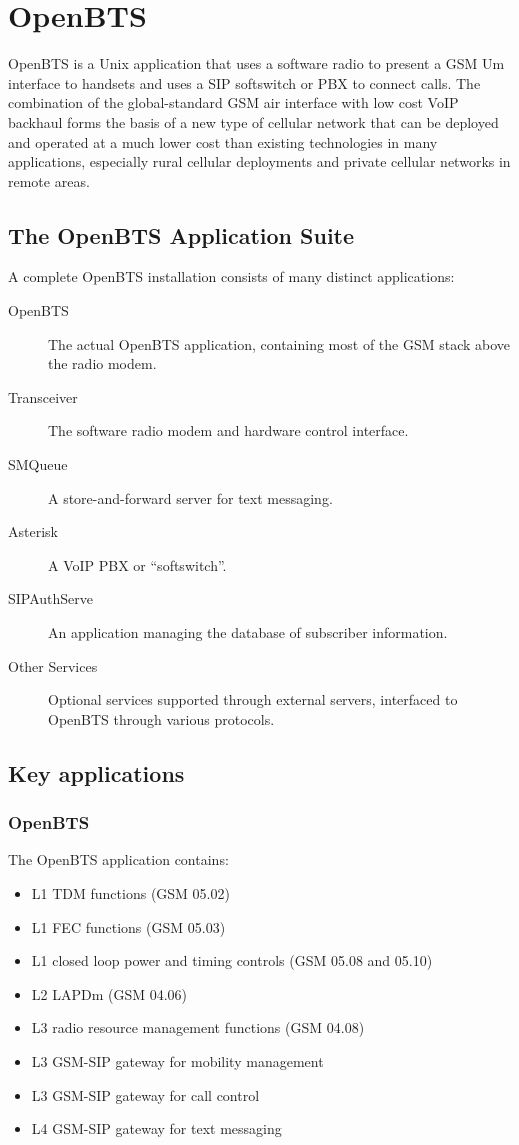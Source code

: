 \chapter{OpenBTS}

OpenBTS is a Unix application that uses a software radio to present a GSM Um interface 
to handsets and uses a SIP softswitch or PBX to connect calls.
The combination of the global-standard GSM air interface with low cost VoIP backhaul 
forms the basis of a new type of cellular network that can be deployed and operated at a much lower
cost than existing technologies in many applications, 
especially rural cellular deployments and private cellular networks in remote areas.

\section{The OpenBTS Application Suite}
A complete OpenBTS installation consists of many distinct applications:

\begin{description}
\item[OpenBTS] The actual OpenBTS application, containing most of
the GSM stack above the radio modem.
\item[Transceiver] The software radio modem and hardware control interface.
\item[SMQueue] A store-and-forward server for text messaging.
\item[Asterisk] A VoIP PBX or ``softswitch''.
\item[SIPAuthServe] An application managing the database of subscriber information.
\item[Other Services] Optional services supported through 
external servers, interfaced to OpenBTS through various protocols.
\end{description}

\section{Key applications}
\subsection{OpenBTS}
The OpenBTS application contains:
\begin{itemize}
\item L1 TDM functions (GSM 05.02)
\item L1 FEC functions (GSM 05.03)
\item L1 closed loop power and timing controls (GSM 05.08 and 05.10)
\item L2 LAPDm (GSM 04.06)
\item L3 radio resource management functions (GSM 04.08)
\item L3 GSM-SIP gateway for mobility management
\item L3 GSM-SIP gateway for call control
\item L4 GSM-SIP gateway for text messaging
\end{itemize}

